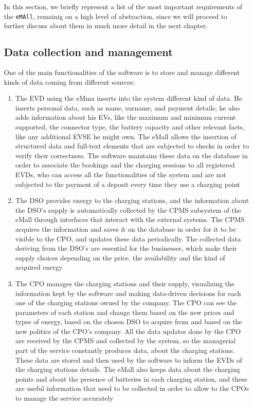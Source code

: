 In this section, we briefly represent a list of the most important requirements of the \verb|eMAll|, remainig on a high level of abstraction, since we will proceed to further discuss about them in much more detail in the next chapter.
\subsection{Data collection and management}
One of the main functionalities of the software is to store and manage different kinds of data coming from different sources:
\begin{enumerate}
    \item The EVD using the eMma inserts into the system different kind of data. He inserts personal data, such as name, surname, and payment details; he also adds information about his EVs, like the maximum and minimum current supported, the connector type, the battery capacity and other relevant facts, like any additional EVSE he might own. The eMall allows the insertion of structured data and full-text elements that are subjected to checks in order to verify their correctness. The software maintains these data on the database in order to associate the bookings and the charging sessions to all registered EVDs, who can access all the functionalities of the system and are not subjected to the payment of a deposit every time they use a charging point
    \item The DSO provides energy to the charging stations, and the information about the DSO's supply is automatically collected by the CPMS subsystem of the eMall through interfaces that interact with the external systems. The CPMS acquires the information and saves it on the database in order for it to be visible to the CPO, and updates these data periodically. The collected data deriving from the DSO's are essential for the businesses, which make their supply choices depending on the price, the availability and the kind of acquired energy 
    \item The CPO manages the charging stations and their supply, visualizing the information kept by the software and making data-driven decisions for each one of the charging stations owned by the company. The CPO can see the parameters of each station and change them based on the new prices and types of energy, based on the chosen DSO to acquire from and based on the new politics of the CPO's company. All the data updates done by the CPO are received by the CPMS and collected by the system, so the managerial part of the service constantly produces data, about the charging stations. These data are stored and then used by the software to inform the EVDs of the charging stations details. The eMall also keeps data about the charging points and about the presence of batteries in each charging station, and these are useful information that need to be collected in order to allow to the CPOs to manage the service accurately

\end{enumerate}
